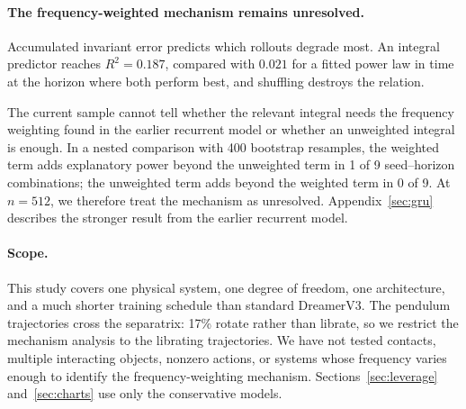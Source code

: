 \paragraph{The frequency-weighted mechanism remains unresolved.} Accumulated invariant error predicts
which rollouts degrade most. An integral predictor reaches $R^2 = 0.187$, compared with $0.021$ for a
fitted power law in time at the horizon where both perform best, and shuffling destroys the relation.

The current sample cannot tell whether the relevant integral needs the frequency weighting found in
the earlier recurrent model or whether an unweighted integral is enough. In a nested comparison with
400 bootstrap resamples, the weighted term adds explanatory power beyond the unweighted term in 1 of
9 seed--horizon combinations; the unweighted term adds beyond the weighted term in 0 of 9. At
$n = 512$, we therefore treat the mechanism as unresolved. Appendix~\ref{sec:gru} describes the
stronger result from the earlier recurrent model.

\paragraph{Scope.} This study covers one physical system, one degree of freedom, one architecture,
and a much shorter training schedule than standard DreamerV3. The pendulum trajectories cross the
separatrix: 17\% rotate rather than librate, so we restrict the mechanism analysis to the librating
trajectories. We have not tested contacts, multiple interacting objects, nonzero actions, or systems
whose frequency varies enough to identify the frequency-weighting mechanism.
Sections~\ref{sec:leverage} and~\ref{sec:charts} use only the conservative models.
